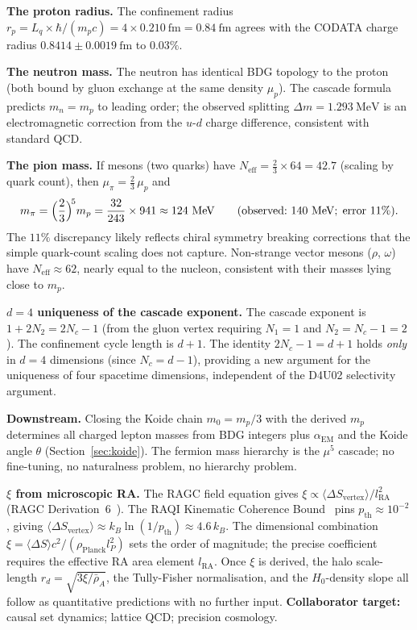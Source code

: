 \documentclass[11pt,a4paper]{article}
\begin{document}
\textbf{The proton radius.}
The confinement radius $r_p = L_q \times \hbar/(m_p c) = 4 \times 0.210~\mathrm{fm}
= 0.84~\mathrm{fm}$ agrees with the CODATA charge radius
$0.8414 \pm 0.0019~\mathrm{fm}$ to $0.03\%$.

\textbf{The neutron mass.}
The neutron has identical BDG topology to the proton (both bound by gluon
exchange at the same density $\mu_p$). The cascade formula predicts
$m_n = m_p$ to leading order; the observed splitting
$\Delta m = 1.293~\mathrm{MeV}$ is an electromagnetic correction from the
$u$-$d$ charge difference, consistent with standard QCD.

\textbf{The pion mass.}
If mesons (two quarks) have $N_{\mathrm{eff}} = \tfrac{2}{3} \times 64 = 42.7$
(scaling by quark count), then $\mu_\pi = \tfrac{2}{3}\,\mu_p$ and
\begin{equation}
  m_\pi = \Bigl(\frac{2}{3}\Bigr)^{\!5} m_p
  = \frac{32}{243}\times 941
  \approx 124~\mathrm{MeV}
  \qquad (\text{observed:}~140~\mathrm{MeV};\;\text{error}~11\%).
  \label{eq:pion_mass}
\end{equation}
The $11\%$ discrepancy likely reflects chiral symmetry breaking corrections
that the simple quark-count scaling does not capture. Non-strange vector
mesons ($\rho$, $\omega$) have $N_{\mathrm{eff}} \approx 62$, nearly equal
to the nucleon, consistent with their masses lying close to $m_p$.

\textbf{$d = 4$ uniqueness of the cascade exponent.}
The cascade exponent is $1 + 2N_2 = 2N_c - 1$ (from the gluon vertex requiring
$N_1 = 1$ and $N_2 = N_c - 1 = 2$). The confinement cycle length is $d + 1$.
The identity $2N_c - 1 = d + 1$ holds \emph{only} in $d = 4$ dimensions
(since $N_c = d - 1$), providing a new argument for the uniqueness of four
spacetime dimensions, independent of the D4U02 selectivity argument.

\textbf{Downstream.}
Closing the Koide chain $m_0 = m_p/3$ with the derived $m_p$
determines all charged lepton masses from BDG integers plus
$\alpha_{\mathrm{EM}}$ and the Koide angle $\theta$ (Section~\ref{sec:koide}).
The fermion mass hierarchy is the $\mu^5$ cascade; no fine-tuning,
no naturalness problem, no hierarchy problem.

\textbf{$\xi$ from microscopic RA.}
The RAGC field equation gives
$\xi \propto \langle\Delta S_{\mathrm{vertex}}\rangle / l_{\mathrm{RA}}^2$
(RAGC Derivation~6~\citep{Sandeman2026RAGC}).
The RAQI Kinematic Coherence Bound~\citep{Sandeman2026RAQI} pins
$p_{\mathrm{th}} \approx 10^{-2}$, giving
$\langle\Delta S_{\mathrm{vertex}}\rangle \approx k_B \ln(1/p_{\mathrm{th}})
\approx 4.6\,k_B$.
The dimensional combination $\xi = \langle\Delta S\rangle c^2 /
(\rho_{\mathrm{Planck}} l_P^2)$ sets the order of magnitude; the precise
coefficient requires the effective RA area element $l_{\mathrm{RA}}$.
Once $\xi$ is derived, the halo scale-length $r_d = \sqrt{3\xi/\bar\rho_A}$,
the Tully-Fisher normalisation, and the $H_0$-density slope all follow as
quantitative predictions with no further input.
\textbf{Collaborator target:} causal set dynamics; lattice QCD; precision cosmology.
\end{document}
